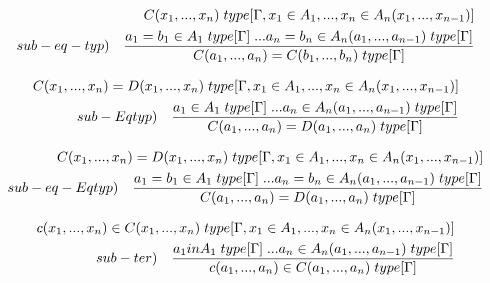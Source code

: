 \documentclass[10pt,a4paper, italian]{book}
\begin{document}
\begin{equation}
\begin{split}
C(x_1,...,x_n)\hspace{0.1cm}type[\Gamma, x_1 \in A_1,...,x_n \in A_n(x_1,...,x_{n-1})] \\ sub-eq-typ) \quad \frac{a_1 = b_1  \in A_1\hspace{0.1cm}type[\Gamma]\hspace{0.1cm}...a_n = b_n \in A_n(a_1,...,a_{n-1})\hspace{0.1cm}type[\Gamma]}{ C(a_1,...,a_n) = C(b_1,...,b_n) \hspace{0.1cm}type[\Gamma]}
\end{split}
\end{equation}

\begin{equation}
\begin{split}
C(x_1,...,x_n) = D(x_1,...,x_n) \hspace{0.1cm}type[\Gamma, x_1 \in A_1,...,x_n \in A_n(x_1,...,x_{n-1})] \\ sub-Eqtyp) \quad \frac{a_1 \in A_1\hspace{0.1cm}type[\Gamma]\hspace{0.1cm}...a_n \in A_n(a_1,...,a_{n-1})\hspace{0.1cm}type[\Gamma]}{ C(a_1,...,a_n) = D(a_1,...,a_n)\hspace{0.1cm}type[\Gamma]}
\end{split}
\end{equation}

\begin{equation}
\begin{split}
C(x_1,...,x_n) = D(x_1,...,x_n) \hspace{0.1cm}type[\Gamma, x_1 \in A_1,...,x_n \in A_n(x_1,...,x_{n-1})] \\ sub-eq-Eqtyp) \quad \frac{a_1 = b_1\in A_1\hspace{0.1cm}type[\Gamma]\hspace{0.1cm}...a_n = b_n \in A_n(a_1,...,a_{n-1})\hspace{0.1cm}type[\Gamma]}{ C(a_1,...,a_n) = D(a_1,...,a_n)\hspace{0.1cm}type[\Gamma]}
\end{split}
\end{equation}

\begin{equation}
\begin{split}
c(x_1,...,x_n) \in C(x_1,...,x_n) \hspace{0.1cm}type[\Gamma, x_1 \in A_1,...,x_n \in A_n(x_1,...,x_{n-1})] \\ sub-ter) \quad \frac{a_1 in A_1\hspace{0.1cm}type[\Gamma]\hspace{0.1cm}...a_n \in A_n(a_1,...,a_{n-1})\hspace{0.1cm}type[\Gamma]}{ c(a_1,...,a_n) \in C(a_1,...,a_n)\hspace{0.1cm}type[\Gamma]}
\end{split}
\end{equation}
\end{document}
